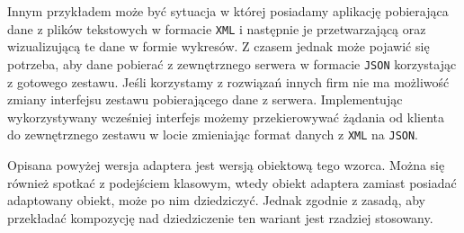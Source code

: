 


Innym przykładem może być sytuacja w której posiadamy aplikację pobierająca dane z plików tekstowych w formacie \texttt{XML} i następnie je przetwarzającą oraz wizualizującą te dane w formie wykresów. Z czasem jednak może pojawić się potrzeba, aby dane pobierać z zewnętrznego serwera w formacie \texttt{JSON} korzystając z gotowego zestawu. Jeśli korzystamy z rozwiązań innych firm nie ma możliwość zmiany interfejsu zestawu pobierającego dane z serwera. Implementując wykorzystywany wcześniej interfejs możemy przekierowywać żądania od klienta do zewnętrznego zestawu w locie zmieniając format danych z \texttt{XML} na \texttt{JSON}.

Opisana powyżej wersja adaptera jest wersją obiektową tego wzorca. Można się również spotkać z podejściem klasowym, wtedy obiekt adaptera zamiast posiadać adaptowany obiekt, może po nim dziedziczyć. Jednak zgodnie z zasadą, aby przekładać kompozycję nad dziedziczenie ten wariant jest rzadziej stosowany. 


